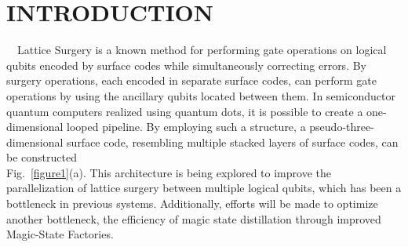 

\frenchspacing
{}
  \section{INTRODUCTION}
  \vspace{-8pt}
  \ \ Lattice Surgery\textsuperscript{\cite{horsman2012}} is a known method for performing gate operations on logical qubits encoded by surface codes while simultaneously correcting errors. By surgery operations, each encoded in separate surface codes, can perform gate operations by using the ancillary qubits located between them. In semiconductor quantum computers realized using quantum dots, it is possible to create a one-dimensional looped pipeline\textsuperscript{\cite{cai2023}}. By employing such a structure, a pseudo-three-dimensional surface code, resembling multiple stacked layers of surface codes, can be constructed \\Fig.\ \ref{figure1}(a). This architecture is being explored to improve the parallelization of lattice surgery between multiple logical qubits, which has been a bottleneck in previous systems. Additionally, efforts will be made to optimize another bottleneck, the efficiency of magic state distillation\textsuperscript{\cite{litinski2019game}\cite{litinski2019magic}} through improved Magic-State Factories.
